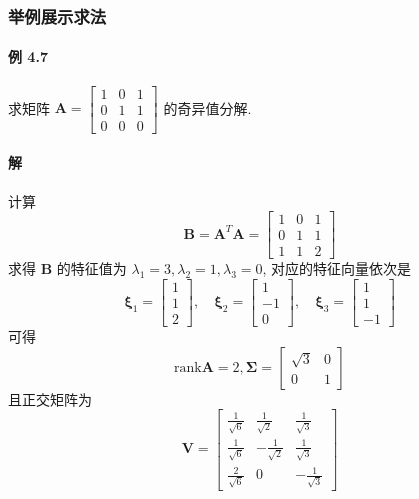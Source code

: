 \subsubsection{举例展示求法}

\paragraph*{例 4.7} 求矩阵 $\bm{A} = \begin{bmatrix}
        1 & 0 & 1 \\
        0 & 1 & 1 \\
        0 & 0 & 0
    \end{bmatrix}$ 的奇异值分解.

\paragraph*{解} 计算
$$
    \bm{B} = \bm{A}^T\bm{A} = \begin{bmatrix}
        1 & 0 & 1 \\
        0 & 1 & 1 \\
        1 & 1 & 2
    \end{bmatrix}
$$
求得 $\bm{B}$ 的特征值为 $\lambda_1 = 3, \lambda_2 = 1, \lambda_3 = 0$, 对应的特征向量依次是
$$
    \bm{\xi}_1 = \begin{bmatrix}
        1 \\
        1 \\
        2
    \end{bmatrix}, \quad
    \bm{\xi}_2 = \begin{bmatrix}
        1  \\
        -1 \\
        0
    \end{bmatrix}, \quad
    \bm{\xi}_3 = \begin{bmatrix}
        1 \\
        1 \\
        -1
    \end{bmatrix}
$$
可得
$$
    \mathrm{rank}\bm{A} = 2, \bm{\Sigma} = \begin{bmatrix}
        \sqrt{3} & 0 \\
        0        & 1
    \end{bmatrix}
$$
且正交矩阵为
$$
    \bm{V} = \begin{bmatrix}
        \frac{1}{\sqrt{6}} & \frac{1}{\sqrt{2}}  & \frac{1}{\sqrt{3}}  \\
        \frac{1}{\sqrt{6}} & -\frac{1}{\sqrt{2}} & \frac{1}{\sqrt{3}}  \\
        \frac{2}{\sqrt{6}} & 0                   & -\frac{1}{\sqrt{3}}
    \end{bmatrix}
$$
